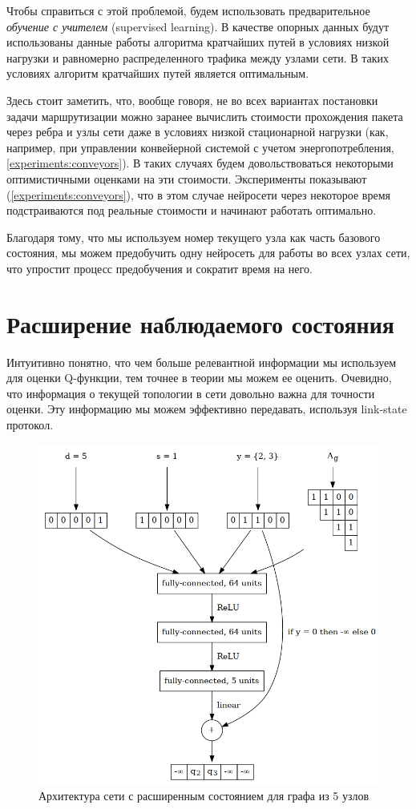 \documentclass[specification, annotation]{itmo-student-thesis}
\begin{document}
Чтобы справиться с этой проблемой, будем использовать предварительное
\textit{обучение с учителем} (supervised learning). В качестве опорных данных
будут использованы данные работы алгоритма кратчайших путей в условиях низкой
нагрузки и равномерно распределенного трафика между узлами сети. В таких
условиях алгоритм кратчайших путей является оптимальным.

Здесь стоит заметить, что, вообще говоря, не во всех вариантах постановки задачи
маршрутизации можно заранее вычислить стоимости прохождения пакета через ребра и
узлы сети даже в условиях низкой стационарной нагрузки (как, например, при
управлении конвейерной системой с учетом энергопотребления,
\ref{experiments:conveyors}). В таких случаях будем довольствоваться некоторыми
оптимистичными оценками на эти стоимости. Эксперименты показывают
(\ref{experiments:conveyors}), что в этом случае нейросети через некоторое время
подстраиваются под реальные стоимости и начинают работать оптимально.

Благодаря тому, что мы используем номер текущего узла как часть базового
состояния, мы можем предобучить одну нейросеть для работы во всех узлах сети,
что упростит процесс предобучения и сократит время на него.

\section{Расширение наблюдаемого состояния}

Интуитивно понятно, что чем больше релевантной информации мы используем для
оценки Q-функции, тем точнее в теории мы можем ее оценить. Очевидно, что
информация о текущей топологии в сети довольно важна для точности оценки. Эту
информацию мы можем эффективно передавать, используя link-state протокол.

\begin{figure}[!h]
  \caption{Архитектура сети с расширенным состоянием для графа из 5 узлов}\label{nn-pic-2}
  \centering
  \includegraphics[scale=0.5]{nn-2}
\end{figure}
\end{document}
